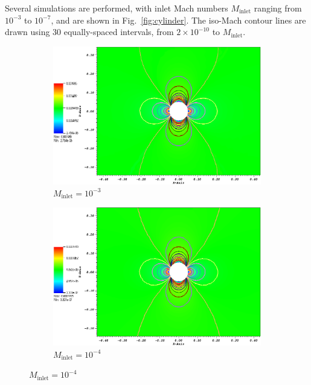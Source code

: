 \documentclass[review,10pt]{elsarticle}
\newcommand{\fig}[1]{Fig.~\ref{#1}}                      %
\begin{document}
Several simulations are performed, with inlet Mach numbers $M_{\text{inlet}}$ ranging from $10^{-3}$ to $10^{-7}$, 
and are shown in \fig{fig:cylinder}. The iso-Mach contour lines are drawn using 30 equally-spaced intervals, from 
$2\times 10^{-10}$ to $M_{\text{inlet}}$.
%
\begin{figure}[H]
        \centering
        \begin{subfigure}[b]{0.495\textwidth}
                \centering
                \includegraphics[width=\textwidth]{figures/CylinderMach1em3ZoomIn.png}
                \caption{$M_{\text{inlet}}=10^{-3}$}
                \label{fig:cyl_1em3}
        \end{subfigure}%
        \begin{subfigure}[b]{0.495\textwidth}
                \centering
                \includegraphics[width=\textwidth]{figures/CylinderMach1em4ZoomIn.png}
                \caption{$M_{\text{inlet}}=10^{-4}$}
                \label{fig:cyl_1em4}
        \end{subfigure}    


\end{figure}
\end{document}
